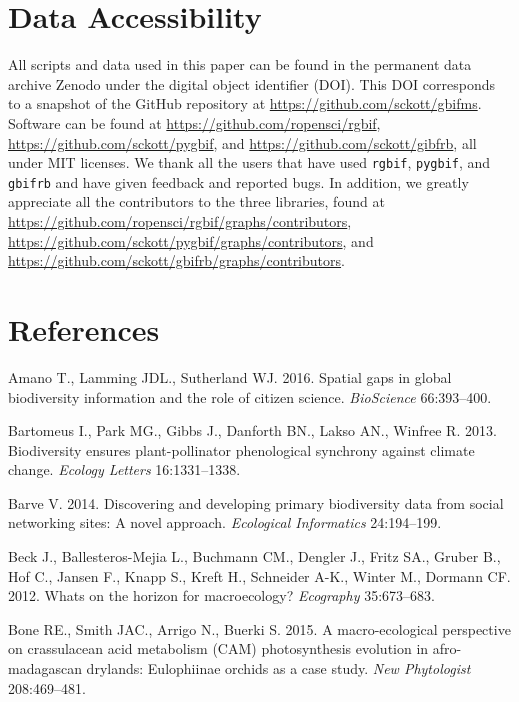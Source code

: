 \documentclass[author-year, review, 11pt]{components/elsarticle} %
\begin{document}
\section{Data Accessibility}\label{data-accessibility}

All scripts and data used in this paper can be found in the permanent
data archive Zenodo under the digital object identifier (DOI). This DOI
corresponds to a snapshot of the GitHub repository at
\url{https://github.com/sckott/gbifms}. Software can be found at
\url{https://github.com/ropensci/rgbif},
\url{https://github.com/sckott/pygbif}, and
\url{https://github.com/sckott/gibfrb}, all under MIT licenses. We thank
all the users that have used \texttt{rgbif}, \texttt{pygbif}, and
\texttt{gbifrb} and have given feedback and reported bugs. In addition,
we greatly appreciate all the contributors to the three libraries, found
at \url{https://github.com/ropensci/rgbif/graphs/contributors},
\url{https://github.com/sckott/pygbif/graphs/contributors}, and
\url{https://github.com/sckott/gbifrb/graphs/contributors}.

\section*{References}\label{references}

\hypertarget{refs}{}
\hypertarget{ref-Amano_2016}{}
Amano T., Lamming JDL., Sutherland WJ. 2016. Spatial gaps in global
biodiversity information and the role of citizen science.
\emph{BioScience} 66:393--400.

\hypertarget{ref-Bartomeus_2013}{}
Bartomeus I., Park MG., Gibbs J., Danforth BN., Lakso AN., Winfree R.
2013. Biodiversity ensures plant-pollinator phenological synchrony
against climate change. \emph{Ecology Letters} 16:1331--1338.

\hypertarget{ref-Barve_2014}{}
Barve V. 2014. Discovering and developing primary biodiversity data from
social networking sites: A novel approach. \emph{Ecological Informatics}
24:194--199.

\hypertarget{ref-Beck_2012}{}
Beck J., Ballesteros-Mejia L., Buchmann CM., Dengler J., Fritz SA.,
Gruber B., Hof C., Jansen F., Knapp S., Kreft H., Schneider A-K., Winter
M., Dormann CF. 2012. Whats on the horizon for macroecology?
\emph{Ecography} 35:673--683.

\hypertarget{ref-Bone_2015}{}
Bone RE., Smith JAC., Arrigo N., Buerki S. 2015. A macro-ecological
perspective on crassulacean acid metabolism (CAM) photosynthesis
evolution in afro-madagascan drylands: Eulophiinae orchids as a case
study. \emph{New Phytologist} 208:469--481.
\end{document}
